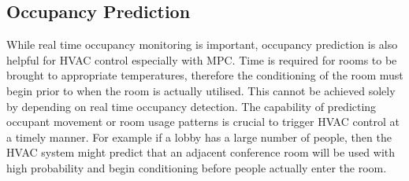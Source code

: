
\subsection{Occupancy Prediction}

While real time occupancy monitoring is important, occupancy prediction is also helpful for HVAC control especially with MPC. Time is required for rooms to be brought to appropriate temperatures, therefore the conditioning of the room must begin prior to when the room is actually utilised. This cannot be achieved solely by depending on real time occupancy detection. The capability of predicting occupant movement or room usage patterns is crucial to trigger HVAC control at a timely manner. %
For example if a lobby has a large number of people, then the HVAC system might predict that an adjacent conference room will be used with high probability and begin conditioning before people actually enter the room.

